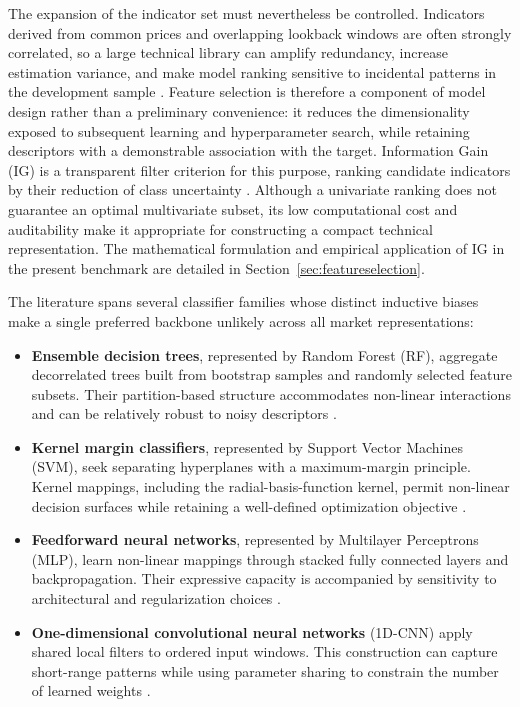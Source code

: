 The expansion of the indicator set must nevertheless be controlled. Indicators derived from common prices and overlapping lookback windows are often strongly correlated, so a large technical library can amplify redundancy, increase estimation variance, and make model ranking sensitive to incidental patterns in the development sample \cite{lei2012feature, kumar2014feature}. Feature selection is therefore a component of model design rather than a preliminary convenience: it reduces the dimensionality exposed to subsequent learning and hyperparameter search, while retaining descriptors with a demonstrable association with the target. Information Gain (IG) is a transparent filter criterion for this purpose, ranking candidate indicators by their reduction of class uncertainty \cite{lei2012feature, anonymous2025precursor}. Although a univariate ranking does not guarantee an optimal multivariate subset, its low computational cost and auditability make it appropriate for constructing a compact technical representation. The mathematical formulation and empirical application of IG in the present benchmark are detailed in Section~\ref{sec:featureselection}.

The literature spans several classifier families whose distinct inductive biases make a single preferred backbone unlikely across all market representations:
\begin{itemize}
    \item \textbf{Ensemble decision trees}, represented by Random Forest (RF), aggregate decorrelated trees built from bootstrap samples and randomly selected feature subsets. Their partition-based structure accommodates non-linear interactions and can be relatively robust to noisy descriptors \cite{nabipour2020predicting}.
    \item \textbf{Kernel margin classifiers}, represented by Support Vector Machines (SVM), seek separating hyperplanes with a maximum-margin principle. Kernel mappings, including the radial-basis-function kernel, permit non-linear decision surfaces while retaining a well-defined optimization objective \cite{naik2019optimal}.
    \item \textbf{Feedforward neural networks}, represented by Multilayer Perceptrons (MLP), learn non-linear mappings through stacked fully connected layers and backpropagation. Their expressive capacity is accompanied by sensitivity to architectural and regularization choices \cite{ecer2020mlp_ga_pso}.
    \item \textbf{One-dimensional convolutional neural networks} (1D-CNN) apply shared local filters to ordered input windows. This construction can capture short-range patterns while using parameter sharing to constrain the number of learned weights \cite{bandgar2025finchronos, dhingra2025solar}.
\end{itemize}

